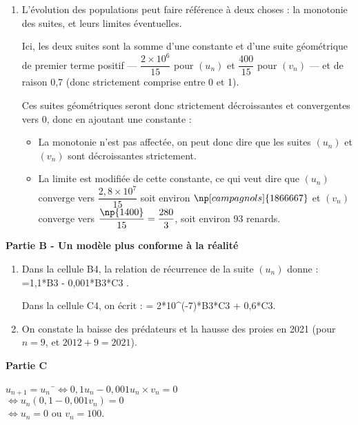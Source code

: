 \documentclass[10pt]{article}
\begin{document}
\begin{enumerate}
\begin{enumerate}
			\item L'évolution des populations peut faire référence à deux choses : la monotonie des suites, et leurs limites éventuelles.
			 
Ici, les deux suites sont la somme d'une constante et d'une suite géométrique de premier terme positif --- $\dfrac{2 \times 10^6}{15}$ pour $(u_n)$ et $\dfrac{400}{15}$ pour $(v_n)$ --- et de raison 0,7 (donc strictement comprise entre 0 et 1).
			 
			 Ces suites géométriques seront donc strictement décroissantes et convergentes vers 0, donc en ajoutant une constante :
			 \begin{itemize}
			 	\item La monotonie n'est pas affectée, on peut donc dire que les suites $(u_n)$ et $(v_n)$ sont décroissantes strictement.
			 	\item La limite est modifiée de cette constante, ce qui veut dire que $(u_n)$ converge vers $\dfrac{2,8 \times 10^7}{15 }$ soit environ $\np[campagnols]{1866667}$ et $(v_n)$ converge vers $\dfrac{\np{1400}}{15} = \dfrac{280}{3}$, soit environ 93 renards.
			 \end{itemize}
		\end{enumerate}
	\end{enumerate}

\bigskip

\textbf{Partie B - Un modèle plus conforme à la réalité}
	
\medskip
	
\begin{enumerate}
	\item Dans la cellule \textsf{B4}, la relation de récurrence de la suite $(u_n)$ donne : \textsf{=1,1*B3 - 0,001*B3*C3 }.
		
Dans la cellule \textsf{C4}, on écrit : \textsf{= 2*10\^{}(-7)*B3*C3 + 0,6*C3}.
		
	\item On constate la baisse des prédateurs et la hausse des proies en 2021 (pour $n = 9$, et $ 2012 + 9 = 2021 $).
\end{enumerate}

\bigskip
	
\textbf{Partie C}
	
\medskip
\begin{tabbing}
$u_{n+1}=u_{n} $~\=$\iff 0,1u_{n} - 0,001u_{n} \times v_{n}=0$\\
\>$\iff u_{n}\left(0,1 - 0,001v_{n}\right)=0$\\
\> $\iff u_{n}=0\text{ ou }v_{n}=100$.
\end{tabbing}
\end{document}
